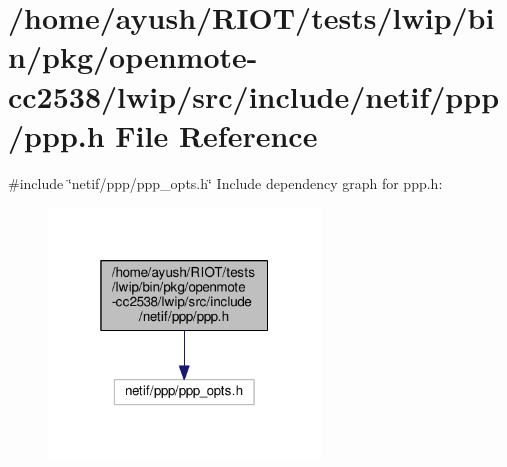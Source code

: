\hypertarget{openmote-cc2538_2lwip_2src_2include_2netif_2ppp_2ppp_8h}{}\section{/home/ayush/\+R\+I\+O\+T/tests/lwip/bin/pkg/openmote-\/cc2538/lwip/src/include/netif/ppp/ppp.h File Reference}
\label{openmote-cc2538_2lwip_2src_2include_2netif_2ppp_2ppp_8h}
{\ttfamily \#include \char`\"{}netif/ppp/ppp\+\_\+opts.\+h\char`\"{}}\newline
Include dependency graph for ppp.\+h\+:
\nopagebreak
\begin{figure}[H]
\begin{center}
\leavevmode
\includegraphics[width=205pt]{openmote-cc2538_2lwip_2src_2include_2netif_2ppp_2ppp_8h__incl}
\end{center}
\end{figure}
